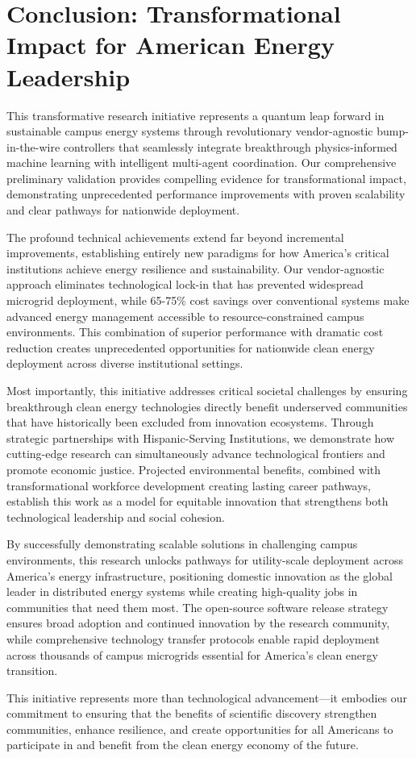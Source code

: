 \documentclass[12pt]{article}
\begin{document}
\section{Conclusion: Transformational Impact for American Energy Leadership}

This transformative research initiative represents a quantum leap forward in sustainable campus energy systems through revolutionary vendor-agnostic bump-in-the-wire controllers that seamlessly integrate breakthrough physics-informed machine learning with intelligent multi-agent coordination. Our comprehensive preliminary validation provides compelling evidence for transformational impact, demonstrating unprecedented performance improvements with proven scalability and clear pathways for nationwide deployment.

The profound technical achievements extend far beyond incremental improvements, establishing entirely new paradigms for how America's critical institutions achieve energy resilience and sustainability. Our vendor-agnostic approach eliminates technological lock-in that has prevented widespread microgrid deployment, while 65-75\% cost savings over conventional systems make advanced energy management accessible to resource-constrained campus environments. This combination of superior performance with dramatic cost reduction creates unprecedented opportunities for nationwide clean energy deployment across diverse institutional settings.

Most importantly, this initiative addresses critical societal challenges by ensuring breakthrough clean energy technologies directly benefit underserved communities that have historically been excluded from innovation ecosystems. Through strategic partnerships with Hispanic-Serving Institutions, we demonstrate how cutting-edge research can simultaneously advance technological frontiers and promote economic justice. Projected environmental benefits, combined with transformational workforce development creating lasting career pathways, establish this work as a model for equitable innovation that strengthens both technological leadership and social cohesion.

By successfully demonstrating scalable solutions in challenging campus environments, this research unlocks pathways for utility-scale deployment across America's energy infrastructure, positioning domestic innovation as the global leader in distributed energy systems while creating high-quality jobs in communities that need them most. The open-source software release strategy ensures broad adoption and continued innovation by the research community, while comprehensive technology transfer protocols enable rapid deployment across thousands of campus microgrids essential for America's clean energy transition.

This initiative represents more than technological advancement---it embodies our commitment to ensuring that the benefits of scientific discovery strengthen communities, enhance resilience, and create opportunities for all Americans to participate in and benefit from the clean energy economy of the future.



\end{document}
